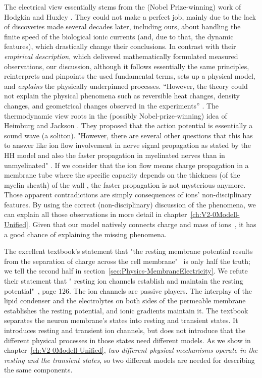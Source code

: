 \ifx\magyar\undefined
The electrical view essentially stems from the (Nobel Prize-winning) work of Hodgkin and Huxley \cite{HodgkinHuxley:1952}. They could not make a perfect job, mainly due to the lack of
discoveries made several decades later, including ours, about handling
the finite speed of the biological ionic currents (and, due to that, the dynamic features), which drastically change
their conclusions. In contrast with their \textit{empirical description}, which delivered mathematically formulated measured observations, our discussion, although it follows essentially
the same principles, reinterprets and pinpoints the used fundamental terms, sets up a physical model, and \textit{explains} the physically underpinned processes. ``However, the theory could not explain the physical
phenomena such as reversible heat changes, density changes,
and geometrical changes observed in the experiments'' \cite{ComparisonHHandSoliton:2010}.
The thermodynamic view roots in the (possibly Nobel-prize-winning)
idea of Heimburg and Jackson \cite{SolitonPropagation:2005}. They proposed that the action potential is essentially a sound wave (a soliton). "However, there are several other questions that this has to answer like ion flow involvement in nerve signal propagation as stated by the \gls{HH} model and also the faster propagation in myelinated nerves than in unmyelinated" \cite{ComparisonHHandSoliton:2010}.
If we consider that the ion flow means charge propagation in a membrane tube where the specific capacity depends on the thickness (of the myelin sheath) of the wall \cite{VeghUnifiedCrossdisciplinaryModel:2026}, the faster propagation is not mysterious anymore.
Those apparent contradictions are simply consequences of ions' non-disciplinary features.
By using the correct (non-disciplinary) discussion of the phenomena,
we can explain all those observations in more detail in chapter~\ref{ch:V2-0Modell-Unified}.
Given that
our model natively connects charge and mass of ions~\cite{VeghNon-ordinaryLaws:2025}, it has a good chance of explaining the missing phenomena.


The excellent textbook's statement that "the resting membrane potential results
from the separation of charge across the
cell membrane"~\cite{PrinciplesNeuralScience:2013} is only half the truth; we tell the second half in section~\ref{sec:Physics-MembraneElectricity}. 
We refute their statement that "%
resting ion channels
establish and maintain the resting potential"~\cite{PrinciplesNeuralScience:2013}, page 126.
The ion channels are passive players. The interplay of 
the lipid condenser and the electrolytes on both sides
of the permeable membrane establishes the resting potential, and ionic gradients maintain it.
The textbook separates the neuron membrane's states into resting and transient states. 
It introduces resting and transient ion channels,
but does not introduce that the different physical processes in those states need different models. 
As we show in chapter~\ref{ch:V2-0Modell-Unified}, \textit{two different physical mechanisms
operate in the resting and the transient states}, so two different models are needed for describing the same components.

